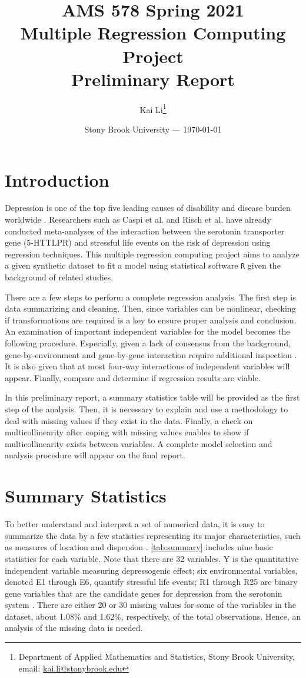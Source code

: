 \documentclass[11pt]{article}
\title{AMS 578 Spring 2021\\Multiple Regression Computing Project\\Preliminary Report}
\author{
  Kai Li\thanks{Department of Applied Mathematics and Statistics, Stony Brook University, email: \href{mailto:kai.li@stonybrook.edu}{kai.li@stonybrook.edu}}
}
\date{Stony Brook University --- \today}
\begin{document}
\maketitle

\section{Introduction}

Depression is one of the top five leading causes of disability and disease burden worldwide \cite{ar:caspi}. Researchers such as Caspi et al. \cite{ar:caspi} and Risch et al. \cite{ar:risch} have already conducted meta-analyses of the interaction between the serotonin transporter gene (5-HTTLPR) and stressful life events on the risk of depression using regression techniques. This multiple regression computing project aims to analyze a given synthetic dataset to fit a model using statistical software \texttt{R} given the background of related studies.

There are a few steps to perform a complete regression analysis. The first step is data summarizing and cleaning. Then, since variables can be nonlinear, checking if transformations are required is a key to ensure proper analysis and conclusion. An examination of important independent variables for the model becomes the following procedure. Especially, given a lack of consensus from the background, gene-by-environment and gene-by-gene interaction require additional inspection \cite{ar:caspi, ar:risch}. It is also given that at most four-way interactions of independent variables will appear. Finally, compare and determine if regression results are viable.

In this preliminary report, a summary statistics table will be provided as the first step of the analysis. Then, it is necessary to explain and use a methodology to deal with missing values if they exist in the data. Finally, a check on multicollinearity after coping with missing values enables to show if multicollinearity exists between variables. A complete model selection and analysis procedure will appear on the final report. 

\section{Summary Statistics}
To better understand and interpret a set of numerical data, it is easy to summarize the data by a few statistics representing its major characteristics, such as measures of location and dispersion \cite{bk:tamhane_dunlop}. \autoref{tab:summary} includes nine basic statistics for each variable. Note that there are 32 variables. Y is the quantitative independent variable measuring depressogenic effect; six environmental variables, denoted E1 through E6, quantify stressful life events; R1 through R25 are binary gene variables that are the candidate genes for depression from the serotonin system \cite{ar:caspi, ar:risch}. There are either 20 or 30 missing values for some of the variables in the dataset, about 1.08\% and 1.62\%, respectively, of the total observations.  Hence, an analysis of the missing data is needed.
\end{document}
